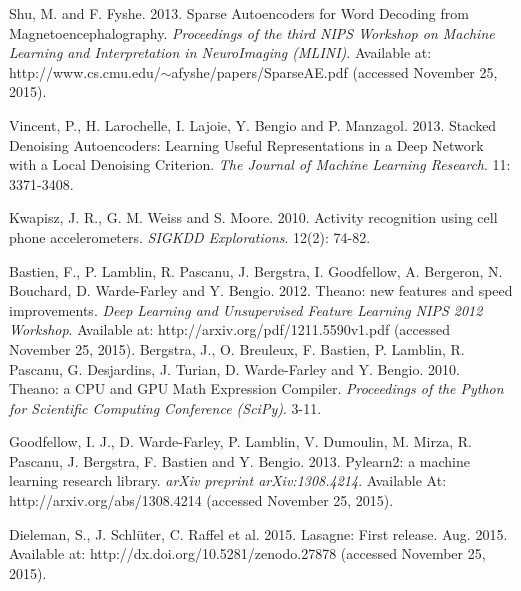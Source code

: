 \documentclass[12pt,notitlepage]{article}
\begin{document}
\begin{thebibliography}{10}
{Shu, M. and F. Fyshe.}
2013. Sparse Autoencoders for Word Decoding from Magnetoencephalography. \emph{Proceedings of the third NIPS Workshop on Machine Learning and Interpretation in NeuroImaging (MLINI)}. Available at: http://www.cs.cmu.edu/$\sim$afyshe/papers/SparseAE.pdf
(accessed November 25, 2015).

{Vincent, P., H. Larochelle, I. Lajoie, Y. Bengio and 
P. Manzagol.}
2013. Stacked Denoising Autoencoders: Learning Useful Representations in
a Deep Network with a Local Denoising Criterion. \emph{The Journal of Machine Learning Research}. 11: 3371-3408.




{Kwapisz, J. R., G. M. Weiss and S. Moore.}
2010. Activity recognition using cell phone
accelerometers. \emph{SIGKDD Explorations}. 12(2): 74-82.

{Bastien, F., P. Lamblin, R. Pascanu, J. Bergstra, I. Goodfellow, A. Bergeron, N. Bouchard, D. Warde-Farley and Y. Bengio.}
2012. Theano: new features and speed improvements. \emph{Deep Learning and Unsupervised Feature Learning NIPS 2012 Workshop}. Available at:  http://arxiv.org/pdf/1211.5590v1.pdf
(accessed November 25, 2015).
{Bergstra, J., O. Breuleux, F. Bastien, P. Lamblin, R. Pascanu, G. Desjardins, J. Turian, D. Warde-Farley and Y. Bengio.}
2010. Theano: a {CPU} and {GPU} Math Expression Compiler. \emph{Proceedings of the Python for Scientific Computing Conference ({SciPy})}. 3-11.

{Goodfellow, I. J., D. Warde-Farley, P. Lamblin, V. Dumoulin, M. Mirza, R. Pascanu, J. Bergstra, F. Bastien and Y. Bengio.}
2013. Pylearn2: a machine learning research library. \emph{arXiv preprint arXiv:1308.4214}. Available At: http://arxiv.org/abs/1308.4214 (accessed November 25, 2015).

{Dieleman, S., J. Schlüter, C. Raffel et al.}
2015. {Lasagne: First release.}
Aug. 2015. Available at: http://dx.doi.org/10.5281/zenodo.27878 (accessed November 25, 2015).


\end{thebibliography}
\end{document}

